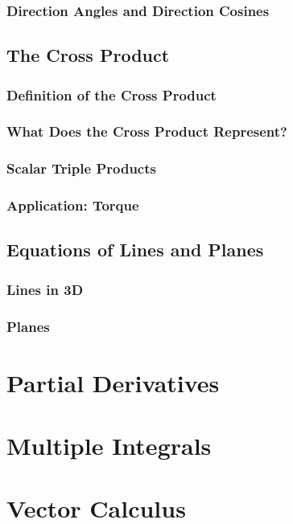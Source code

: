 \documentclass{package/notes}
\begin{document}
\subsection{Direction Angles and Direction Cosines}



\section{The Cross Product}

\subsection{Definition of the Cross Product}

\subsection{What Does the Cross Product Represent?}

\subsection{Scalar Triple Products}

\subsection{Application: Torque}




\section{Equations of Lines and Planes}

\subsection{Lines in 3D}

\subsection{Planes}




\chapter{Partial Derivatives}



\chapter{Multiple Integrals}



\chapter{Vector Calculus}
\end{document}
